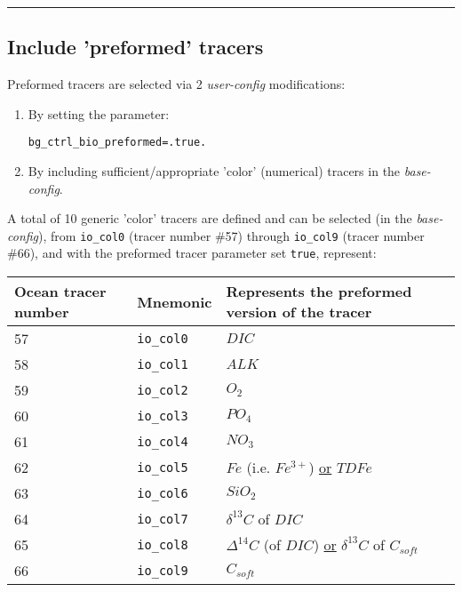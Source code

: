 \noindent\rule{4cm}{0.5pt}

%
\newpage
\subsection*{Include 'preformed' tracers}
\vspace{1mm}

Preformed tracers are selected via 2 \textit{user-config} modifications:

\begin{enumerate}
\vspace{1mm}
\item By setting the parameter:
\vspace{-1mm}\small\begin{verbatim}
bg_ctrl_bio_preformed=.true.
\end{verbatim}\normalsize\vspace{-1mm}
\vspace{1mm}
\item By including sufficient/appropriate 'color' (numerical) tracers in the \textit{base-config}.
\end{enumerate}
\vspace{2mm}

\noindent A total of 10 generic 'color' tracers are defined and can be selected (in the \textit{base-config}), from \texttt{io\_col0} (tracer number \#57) through \texttt{io\_col9} (tracer number \#66), and with the preformed tracer parameter set \texttt{true}, represent:

\begin{table}[ht]
\begin{tabular}{l l l} %
\hline\hline %
Ocean tracer number & Mnemonic & Represents the preformed version of the tracer \\ [0.5ex] %
\hline %
57 & \texttt{io\_col0} & \(DIC\) \\
58 & \texttt{io\_col1} & \(ALK\) \\
59 & \texttt{io\_col2} & \(O_{2}\) \\
60 & \texttt{io\_col3} & \(PO_{4}\) \\
61 & \texttt{io\_col4} & \(NO_{3}\) \\
62 & \texttt{io\_col5} & \(Fe\) (i.e. \(Fe^{3+}\)) \uline{or} \(TDFe\) \\
63 & \texttt{io\_col6} & \(SiO_{2}\) \\
64 & \texttt{io\_col7} & \(\delta^{13}C\) of \(DIC\) \\
65 & \texttt{io\_col8} & \(\Delta^{14}C\) (of \(DIC\)) \uline{or} \(\delta^{13}C\) of \(C_{soft}\) \\
66 & \texttt{io\_col9} & \(C_{soft}\) \\
[1pt] %
\hline %
\end{tabular}
\label{tab:nonlin} %
\end{table}


